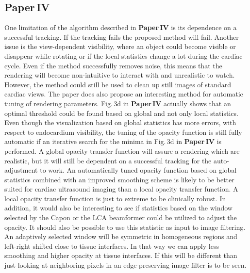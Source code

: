 \subsection{Paper\,IV}
One limitation of the algorithm described in \textbf{Paper\,IV} is its dependence on a successful tracking. If the tracking fails the proposed method will fail.  Another issue is the view-dependent visibility, where an object could become visible or disappear while rotating or if the local statistics change a lot during the cardiac cycle. Even if the method successfully removes noise, this means that the rendering will become non-intuitive to interact with and unrealistic to watch. However, the method could still be used to clean up still images of standard cardiac views. The paper does also propose an interesting method for automatic tuning of rendering parameters. Fig.\,3d in \textbf{Paper\,IV} actually shows that an optimal threshold could be found based on global and not only local statistics. Even though the visualization based on global statistics has more errors, with respect to endocardium visibility, the tuning of the opacity function is still fully automatic if an iterative search for the minima in Fig.\,3d in \textbf{Paper\,IV} is performed. A global opacity transfer function will assure a rendering which are realistic, but it will still be dependent on a successful tracking for the auto-adjustment to work. An automatically tuned opacity function based on global statistics combined with an improved smoothing scheme is likely to be better suited for cardiac ultrasound imaging than a local opacity transfer function. A local opacity transfer function is just to extreme to be clinically robust. In addition, it would also be interesting to see if statistics based on the window selected by the Capon or the LCA beamformer could be utilized to adjust the opacity. It should also be possible to use this statistic as input to image filtering. An adaptively selected window will be symmetric in homogeneous regions and left-right shifted close to tissue interfaces. In that way we can apply less smoothing and higher opacity at tissue interfaces. If this will be different than just looking at neighboring pixels in an edge-preserving image filter is to be seen.

